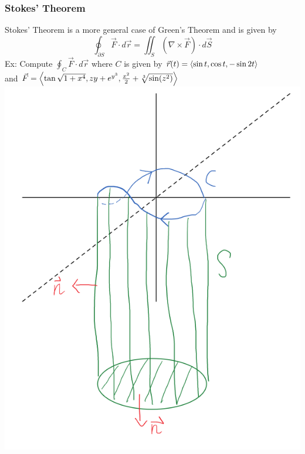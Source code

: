 \documentclass[11pt, fleqn]{article}
\begin{document}
\subsubsection{Stokes' Theorem}
Stokes' Theorem is a more general case of Green's Theorem and is given by
$$\oint_{\partial S}\vec{F}\cdot d\vec{r}=\iint_S(\nabla\times\vec{F})\cdot d\vec{S}$$
Ex: Compute $\oint_C\vec{F}\cdot d\vec{r}$ where $C$ is given by $\vec{r}(t)=\left\langle \sin t,\cos t,-\sin 2t \right\rangle$\\
and $\vec{F}=\left\langle \tan\sqrt{1+x^4},zy+e^{y^3},\frac{x^2}{2}+\sqrt[3]{\sin(z^2)} \right\rangle$\\
\includegraphics[scale=0.5]{Math217Pictures/stokesThmEx.png}
\end{document}
